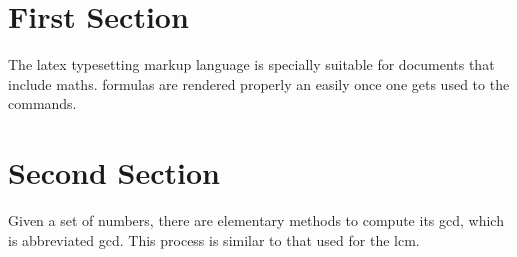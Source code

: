 \documentclass{article}
\begin{document}
\tableofcontents

\section{First Section}

The \Gls{latex} typesetting markup language is specially suitable for documents that include \gls{maths}. \Glspl{formula} are rendered properly an easily once one gets used to the commands.


\clearpage

\section{Second Section}

\vspace{5mm}

Given a set of numbers, there are elementary methods to compute its \acrlong{gcd}, which is abbreviated \acrshort{gcd}. This process is similar to that used for the \acrfull{lcm}.


\clearpage

\printglossary

\clearpage

\printglossary[type=\acronymtype]
\end{document}
